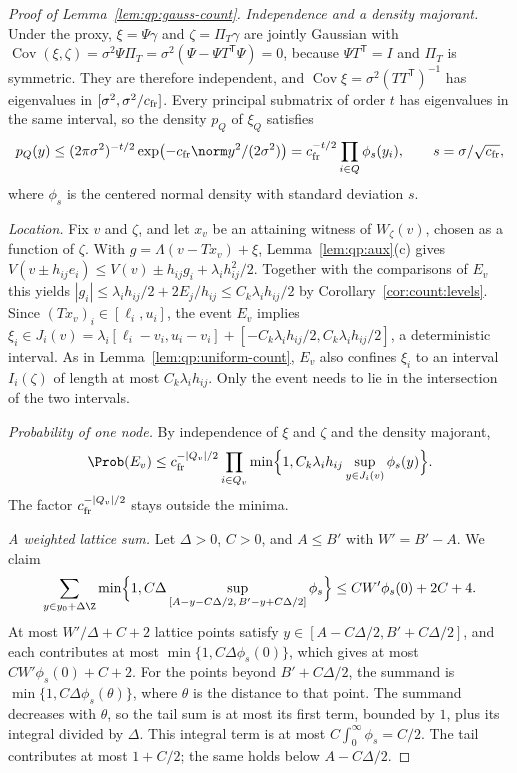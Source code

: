 \begin{proof}[Proof of Lemma~\ref{lem:qp:gauss-count}]
\emph{Independence and a density majorant.} Under the proxy, $\xi=\Psi\gamma$
and $\zeta=\Pi_T\gamma$ are jointly Gaussian with
$\operatorname{Cov}(\xi,\zeta)=\sigma^2\Psi\Pi_T=\sigma^2(\Psi-\Psi T^{\mathsf T}\Psi)=0$,
because $\Psi T^{\mathsf T}=I$ and $\Pi_T$ is symmetric. They are therefore
independent, and
$\operatorname{Cov}\xi=\sigma^2(TT^{\mathsf T})^{-1}$ has eigenvalues in
$[\sigma^2,\sigma^2/c_{\rm fr}]$. Every principal submatrix of order $t$ has
eigenvalues in the same interval, so the density $p_Q$ of $\xi_Q$ satisfies
\[
 p_Q(y)\le(2\pi\sigma^2)^{-t/2}\exp\bigl(-c_{\rm fr}\norm y^2/(2\sigma^2)\bigr)
 =c_{\rm fr}^{-t/2}\prod_{i\in Q}\phi_s(y_i),
 \qquad s=\sigma/\sqrt{c_{\rm fr}},
\]
where $\phi_s$ is the centered normal density with standard deviation $s$.

\emph{Location.} Fix $v$ and $\zeta$, and let $x_v$ be an attaining witness of
$W_\zeta(v)$, chosen as a function of $\zeta$. With
$g=\Lambda(v-Tx_v)+\xi$, Lemma~\ref{lem:qp:aux}(c) gives
$V(v\pm h_{ij}e_i)\le V(v)\pm h_{ij}g_i+\lambda_ih_{ij}^2/2$. Together with the
comparisons of $E_v$ this yields $|g_i|\le\lambda_ih_{ij}/2+2E_j/h_{ij}\le C_k\lambda_ih_{ij}/2$
by Corollary~\ref{cor:count:levels}. Since $(Tx_v)_i\in[\ell_i,u_i]$, the event
$E_v$ implies $\xi_i\in J_i(v)=\lambda_i[\ell_i-v_i,u_i-v_i]+[-C_k\lambda_ih_{ij}/2,C_k\lambda_ih_{ij}/2]$,
a deterministic interval. As in Lemma~\ref{lem:qp:uniform-count}, $E_v$ also
confines $\xi_i$ to an interval $I_i(\zeta)$ of length at most
$C_k\lambda_ih_{ij}$. Only the event needs to lie in the intersection of the
two intervals.

\emph{Probability of one node.} By independence of $\xi$ and $\zeta$ and the
density majorant,
\[
 \Prob(E_v)\le c_{\rm fr}^{-|Q_v|/2}\prod_{i\in Q_v}
 \min\Bigl\{1,C_k\lambda_ih_{ij}\sup_{y\in J_i(v)}\phi_s(y)\Bigr\}.
\]
The factor $c_{\rm fr}^{-|Q_v|/2}$ stays outside the minima.

\emph{A weighted lattice sum.} Let $\Delta>0$, $C>0$, and $A\le B'$ with
$W'=B'-A$. We claim
\[
 \sum_{y\in y_0+\Delta\Z}\min\Bigl\{1,C\Delta\sup_{[A-y-C\Delta/2,\,B'-y+C\Delta/2]}\phi_s\Bigr\}
 \le CW'\phi_s(0)+2C+4 .
\]
At most $W'/\Delta+C+2$ lattice points satisfy
$y\in[A-C\Delta/2,B'+C\Delta/2]$, and each contributes at most
$\min\{1,C\Delta\phi_s(0)\}$, which gives at most $CW'\phi_s(0)+C+2$. For the
points beyond $B'+C\Delta/2$, the summand is
$\min\{1,C\Delta\phi_s(\theta)\}$, where $\theta$ is the distance to that
point. The summand decreases with $\theta$, so the tail sum is at most its
first term, bounded by $1$, plus its integral divided by $\Delta$.
This integral term is at most $C\int_0^\infty\phi_s=C/2$.
The tail contributes at most $1+C/2$; the same holds below $A-C\Delta/2$.


\end{proof}
